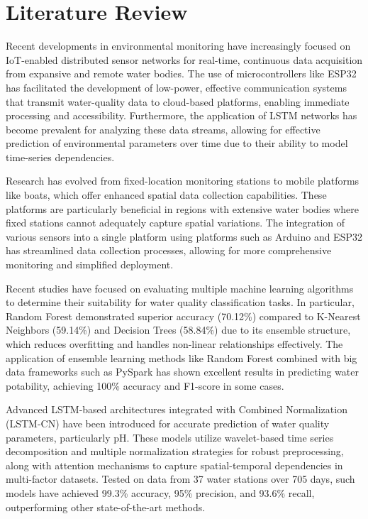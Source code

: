 \documentclass[conference]{IEEEtran}
\begin{document}
\section{Literature Review}
Recent developments in environmental monitoring have increasingly focused on IoT-enabled distributed sensor networks for real-time, continuous data acquisition from expansive and remote water bodies. The use of microcontrollers like ESP32 has facilitated the development of low-power, effective communication systems that transmit water-quality data to cloud-based platforms, enabling immediate processing and accessibility. Furthermore, the application of LSTM networks has become prevalent for analyzing these data streams, allowing for effective prediction of environmental parameters over time due to their ability to model time-series dependencies.

Research has evolved from fixed-location monitoring stations to mobile platforms like boats, which offer enhanced spatial data collection capabilities. These platforms are particularly beneficial in regions with extensive water bodies where fixed stations cannot adequately capture spatial variations. The integration of various sensors into a single platform using platforms such as Arduino and ESP32 has streamlined data collection processes, allowing for more comprehensive monitoring and simplified deployment.

Recent studies have focused on evaluating multiple machine learning algorithms to determine their suitability for water quality classification tasks. In particular, Random Forest demonstrated superior accuracy (70.12\%) compared to K-Nearest Neighbors (59.14\%) and Decision Trees (58.84\%) due to its ensemble structure, which reduces overfitting and handles non-linear relationships effectively. The application of ensemble learning methods like Random Forest combined with big data frameworks such as PySpark has shown excellent results in predicting water potability, achieving 100\% accuracy and F1-score in some cases.

Advanced LSTM-based architectures integrated with Combined Normalization (LSTM-CN) have been introduced for accurate prediction of water quality parameters, particularly pH. These models utilize wavelet-based time series decomposition and multiple normalization strategies for robust preprocessing, along with attention mechanisms to capture spatial-temporal dependencies in multi-factor datasets. Tested on data from 37 water stations over 705 days, such models have achieved 99.3\% accuracy, 95\% precision, and 93.6\% recall, outperforming other state-of-the-art methods.
\end{document}
